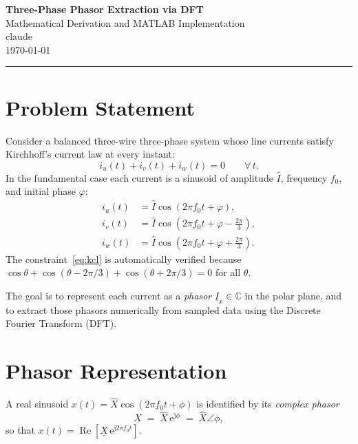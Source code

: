 \documentclass[11pt,a4paper]{article}
\DeclareMathOperator{\Real}{Re}
\newcommand{\jj}{\mathrm{j}}          %
\newcommand{\e}{\mathrm{e}}           %
\begin{document}
\begin{center}
  {\LARGE\bfseries Three-Phase Phasor Extraction via DFT}\\[0.6em]
  {\large Mathematical Derivation and MATLAB Implementation}\\[0.4em]
  {\normalsize claude}\\[0.2em]
  {\small \today}
\end{center}

\vspace{0.5em}
\hrule
\vspace{1em}

\section{Problem Statement}

Consider a balanced three-wire three-phase system whose line currents satisfy
Kirchhoff's current law at every instant:
\begin{equation}
  i_u(t) + i_v(t) + i_w(t) = 0 \qquad \forall\, t.
  \label{eq:kcl}
\end{equation}
In the fundamental case each current is a sinusoid of amplitude $\hat{I}$,
frequency $f_0$, and initial phase $\varphi$:
\begin{align}
  i_u(t) &= \hat{I}\cos(2\pi f_0 t + \varphi),              \label{eq:iu}\\
  i_v(t) &= \hat{I}\cos\!\left(2\pi f_0 t + \varphi - \tfrac{2\pi}{3}\right),\label{eq:iv}\\
  i_w(t) &= \hat{I}\cos\!\left(2\pi f_0 t + \varphi + \tfrac{2\pi}{3}\right).\label{eq:iw}
\end{align}
The constraint~\eqref{eq:kcl} is automatically verified because
$\cos\theta + \cos(\theta-2\pi/3) + \cos(\theta+2\pi/3) = 0$ for all $\theta$.

The goal is to represent each current as a \emph{phasor}
$\underline{I}_x \in \mathbb{C}$ in the polar plane, and to extract those
phasors numerically from sampled data using the Discrete Fourier Transform (DFT).

\section{Phasor Representation}

A real sinusoid $x(t) = \hat{X}\cos(2\pi f_0 t + \phi)$ is identified by its
\emph{complex phasor}
\begin{equation}
  \underline{X} \;=\; \hat{X}\,\e^{\jj\phi} \;=\; \hat{X}\angle\phi,
  \label{eq:phasor_def}
\end{equation}
so that $x(t) = \Real\!\left[\underline{X}\,\e^{\jj 2\pi f_0 t}\right]$.
\end{document}
